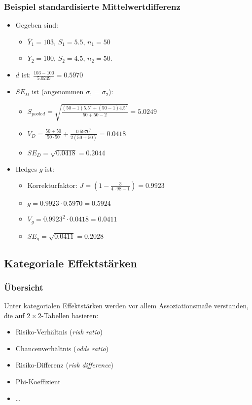  
\begin{frame}\frametitle{Beispiel standardisierte Mittelwertdifferenz}
  \begin{itemize}
  \item Gegeben sind:
    \begin{itemize}
    \item $\overline{Y}_1=103$, $S_1=5.5$, $n_1=50$
    \item $\overline{Y}_2=100$, $S_2=4.5$, $n_2=50$.
    \end{itemize}
  \item $d$ ist: $\frac{103-100}{5.0249}=0.5970$
  \item $SE_D$ ist (angenommen $\sigma_1 = \sigma_2$):
    \begin{itemize}
    \item $S_{pooled}=\sqrt{\frac{(50-1)5.5^2 + (50-1)4.5^2}{50+50-2}}=5.0249$
    \item $V_D = \frac{50+50}{50 \cdot 50} + \frac{0.5970^2}{2(50+50)} = 0.0418$
    \item $SE_D= \sqrt{0.0418} = 0.2044$
    \end{itemize}
  \item Hedges $g$ ist:
    \begin{itemize}
    \item Korrekturfaktor: $J=\left(1-\frac{3}{4 \cdot 98 - 1}\right)=0.9923$
    \item $g=0.9923 \cdot 0.5970 = 0.5924$
    \item $V_g = 0.9923^2 \cdot 0.0418=0.0411$
    \item $SE_g= \sqrt{0.0411}= 0.2028$
    \end{itemize}
  \end{itemize}
  \vfill
  \citep[26ff]{borenstein_introduction_2009}
\end{frame}


\subsection{Kategoriale Effektstärken}

\begin{frame}\frametitle{Übersicht}
 
  Unter kategorialen Effektstärken werden vor allem Assoziationsmaße verstanden, die auf $2 \times 2$-Tabellen basieren:
  \begin{itemize}
  \item Risiko-Verhältnis (\emph{risk ratio})
  \item Chancenverhältnis (\emph{odds ratio})
  \item Risiko-Differenz (\emph{risk difference})
  \item Phi-Koeffizient
  \item \ldots
  \end{itemize}
\end{frame}


